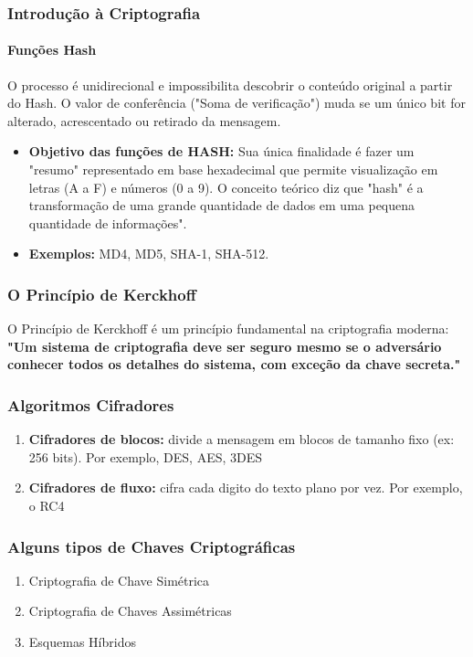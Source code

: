 \documentclass[compress]{beamer}
\begin{document}
\begin{frame}
\frametitle{Introdução à Criptografia}
\framesubtitle{Funções Hash}
\justifying
O processo é unidirecional e impossibilita descobrir o conteúdo original a partir do Hash. O valor de conferência ("Soma de verificação") muda se um único bit for alterado, acrescentado ou retirado da mensagem.
	\begin{itemize}
		\justifying
		\item<+->{\textbf{Objetivo das funções de HASH:} Sua única finalidade é fazer um "resumo" representado em base hexadecimal que permite  visualização em letras (A a F) e números (0 a 9). O conceito teórico diz que "hash" é a transformação de uma grande quantidade de dados em uma pequena quantidade de informações".}
		\item<+->{\textbf{Exemplos:} MD4, MD5, SHA-1, SHA-512.}
	\end{itemize}	
\end{frame}

\begin{frame}
\frametitle{O Princípio de Kerckhoff}
	\center
	O Princípio de Kerckhoff é um princípio fundamental na criptografia moderna: \\
	\textbf{"Um sistema de criptografia deve ser seguro mesmo se o adversário conhecer todos os detalhes do sistema, com exceção da chave secreta."}
\end{frame}

\begin{frame}
\frametitle{Algoritmos Cifradores}
\justifying
	\begin{enumerate}
		\item<+->{\textbf{Cifradores de blocos:} divide a mensagem em blocos de tamanho fixo (ex: 256 bits). Por exemplo, DES, AES, 3DES}
		\item<+->{\textbf{Cifradores de fluxo:} cifra cada digito do texto plano por vez. Por exemplo, o RC4}
	\end{enumerate}
\end{frame}


\begin{frame}
\frametitle{Alguns tipos de Chaves Criptográficas}
		\begin{enumerate}
			\item<+->{Criptografia de Chave Simétrica}
			\item<+->{Criptografia de Chaves Assimétricas}
			\item<+->{Esquemas Híbridos}
		\end{enumerate}
\end{frame}
\end{document}
